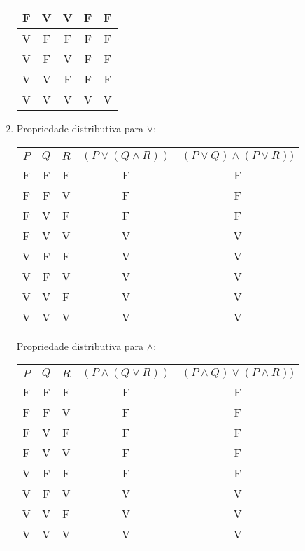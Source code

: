 \documentclass[12pt, letterpaper]{report}
\begin{document}
\begin{enumerate}[label=\arabic*.]
\begin{table}[ht!]
\begin{tabular}{| c | c | c | c | c |}
              F & V & V & F & F \\ \hline
              V & F & F & F & F \\ \hline
              V & F & V & F & F \\ \hline
              V & V & F & F & F \\ \hline
              V & V & V & V & V \\ \hline
            \end{tabular}
          \end{table}
    \newpage
    \item Propriedade distributiva para $\lor$:
            \begin{table}[ht!]
            \centering
            \begin{tabular}{| c | c | c | c | c |}
              \hline
              $ P $ & $ Q $ & $ R $ & $ (P \lor (Q \land R)) $ & $ (P \lor Q) \land (P \lor R)) $ \\
              \hline
              F & F & F & F & F \\ \hline
              F & F & V & F & F \\ \hline
              F & V & F & F & F \\ \hline
              F & V & V & V & V \\ \hline
              V & F & F & V & V \\ \hline
              V & F & V & V & V \\ \hline
              V & V & F & V & V \\ \hline
              V & V & V & V & V \\ \hline
            \end{tabular}
          \end{table}

          Propriedade distributiva para $\land$:
            \begin{table}[ht!]
            \centering
            \begin{tabular}{| c | c | c | c | c |}
              \hline
              $ P $ & $ Q $ & $ R $ & $ (P \land (Q \lor R)) $ & $ (P \land Q) \lor (P \land R)) $ \\
              \hline
              F & F & F & F & F \\ \hline
              F & F & V & F & F \\ \hline
              F & V & F & F & F \\ \hline
              F & V & V & F & F \\ \hline
              V & F & F & F & F \\ \hline
              V & F & V & V & V \\ \hline
              V & V & F & V & V \\ \hline
              V & V & V & V & V \\ \hline
            \end{tabular}
          \end{table}


\end{enumerate}
\end{document}
